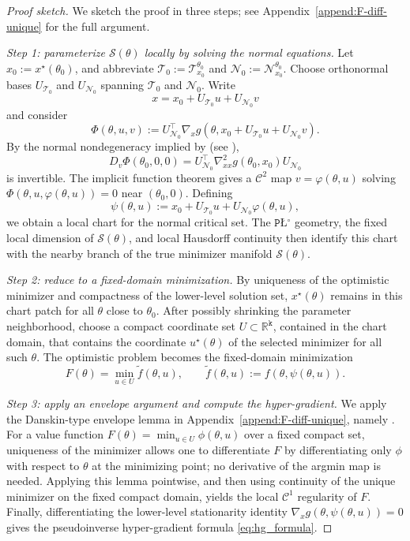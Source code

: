 \documentclass{article}
\theoremstyle{normaltheorem}
\newcommand{\PLcirc}{\texttt{P\L$^\circ$}}
\newcommand{\dimk}{\texttt{k}}
\newcommand{\calS}{\mathcal{S}}
\newcommand{\calT}{\mathcal{T}}
\newcommand{\calN}{\mathcal{N}}
\begin{document}
\begin{proof}[Proof sketch]
We sketch the proof in three steps; see Appendix~\ref{append:F-diff-unique} for the full argument.

\smallskip\noindent
\emph{Step 1: parameterize \(\calS(\theta)\) locally by solving the normal equations.}
Let \(x_0:=x^\star(\theta_0)\), and abbreviate
\(\calT_0:=\calT_{x_0}^{\theta_0}\) and \(\calN_0:=\calN_{x_0}^{\theta_0}\).
Choose orthonormal bases \(U_{\calT_0}\) and \(U_{\calN_0}\) spanning \(\calT_0\) and \(\calN_0\). Write
\[
x=x_0+U_{\calT_0}u+U_{\calN_0}v
\]
and consider
\[
\Phi(\theta,u,v)
:=
U_{\calN_0}^{\top}\nabla_x g(\theta,x_0+U_{\calT_0}u+U_{\calN_0}v).
\]
By the normal nondegeneracy implied by  (see ),
\[
D_v\Phi(\theta_0,0,0)
=
U_{\calN_0}^{\top}\nabla^2_{xx}g(\theta_0,x_0)U_{\calN_0}
\]
is invertible. The implicit function theorem gives a \(\mathcal C^2\) map \(v=\varphi(\theta,u)\) solving
\(\Phi(\theta,u,\varphi(\theta,u))=0\) near \((\theta_0,0)\). Defining
\[
\psi(\theta,u):=x_0+U_{\calT_0}u+U_{\calN_0}\varphi(\theta,u),
\]
we obtain a local chart for the normal critical set. The \(\PLcirc\) geometry, the fixed local dimension of
\(\calS(\theta)\), and local Hausdorff continuity then identify this chart with the nearby branch of the true minimizer
manifold \(\calS(\theta)\).

\smallskip\noindent
\emph{Step 2: reduce to a fixed-domain minimization.}
By uniqueness of the optimistic minimizer and compactness of the lower-level solution set, \(x^\star(\theta)\) remains in
this chart patch for all \(\theta\) close to \(\theta_0\). After possibly shrinking the parameter neighborhood, choose a
compact coordinate set \(U\subset\mathbb R^{\dimk}\), contained in the chart domain, that contains the coordinate
\(u^\star(\theta)\) of the selected minimizer for all such \(\theta\). The optimistic problem becomes the fixed-domain
minimization
\[
F(\theta)=\min_{u\in U}\tilde f(\theta,u),
\qquad
\tilde f(\theta,u):=f(\theta,\psi(\theta,u)).
\]

\smallskip\noindent
\emph{Step 3: apply an envelope argument and compute the hyper-gradient.}
We apply the Danskin-type envelope lemma in Appendix~\ref{append:F-diff-unique}, namely
. For a value function \(F(\theta)=\min_{u\in U}\phi(\theta,u)\) over a fixed compact set,
uniqueness of the minimizer allows one to differentiate \(F\) by differentiating only \(\phi\) with respect to
\(\theta\) at the minimizing point; no derivative of the argmin map is needed. Applying this lemma pointwise, and then
using continuity of the unique minimizer on the fixed compact domain, yields the local \(\mathcal C^1\) regularity of
\(F\). Finally, differentiating the lower-level stationarity identity
\(\nabla_x g(\theta,\psi(\theta,u))=0\) gives the pseudoinverse hyper-gradient formula \eqref{eq:hg_formula}.
\end{proof}
\end{document}
